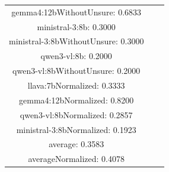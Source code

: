 \documentclass[a4paper]{article}
\begin{document}
\begin{tabular}{ccc}
gemma4:12bWithoutUnsure: 0.6833 \\ ministral-3:8b: 0.3000 \\ ministral-3:8bWithoutUnsure: 0.3000 \\ qwen3-vl:8b: 0.2000 \\ qwen3-vl:8bWithoutUnsure: 0.2000 \\ llava:7bNormalized: 0.3333 \\ gemma4:12bNormalized: 0.8200 \\ qwen3-vl:8bNormalized: 0.2857 \\ ministral-3:8bNormalized: 0.1923 \\ average: 0.3583 \\ averageNormalized: 0.4078 \end{minipage}\\
\end{tabular}

\vspace{5mm}
\end{document}
